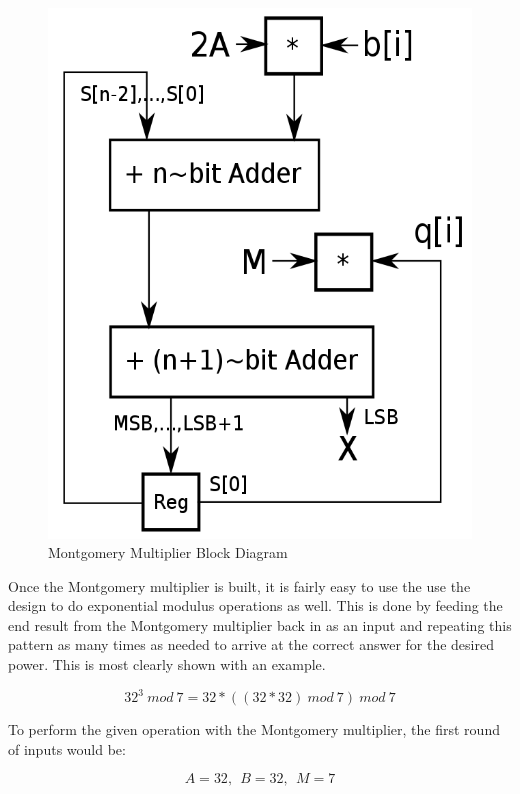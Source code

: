 \documentclass[journal]{IEEEtran}
\begin{document}
	\begin{figure}[h]
		\centering
		\includegraphics[scale=0.2]{pics/Montgomery_exp_mult.png}
		\caption{Montgomery Multiplier Block Diagram}
	\end{figure}   


Once the Montgomery multiplier is built, it is fairly easy to use the use the design to do exponential modulus operations as well. This is done by feeding the end result from the Montgomery multiplier back in as an input and repeating this pattern as many times as needed to arrive at the correct answer for the desired power. This is most clearly shown with an example.  

\begin{displaymath}
	32^3\ mod\ 7 = 32*((32*32)\ mod\ 7)\ mod\ 7
\end{displaymath}

To perform the given operation with the Montgomery multiplier, the first round of inputs would be:

\begin{displaymath}
	A = 32,\ \ B = 32,\ \ M = 7
\end{displaymath}
\end{document}
